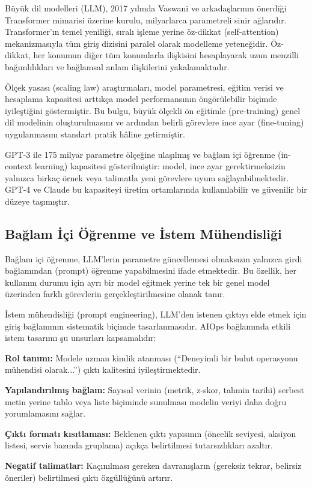 Büyük dil modelleri (LLM), 2017 yılında Vaswani ve arkadaşlarının önerdiği Transformer mimarisi üzerine kurulu, milyarlarca parametreli sinir ağlarıdır.
Transformer'ın temel yeniliği, sıralı işleme yerine öz-dikkat (self-attention) mekanizmasıyla tüm giriş dizisini paralel olarak modelleme yeteneğidir.
Öz-dikkat, her konumun diğer tüm konumlarla ilişkisini hesaplayarak uzun menzilli bağımlılıkları ve bağlamsal anlam ilişkilerini yakalamaktadır.

Ölçek yasası (scaling law) araştırmaları, model parametresi, eğitim verisi ve hesaplama kapasitesi arttıkça model performansının öngörülebilir biçimde iyileştiğini göstermiştir.
Bu bulgu, büyük ölçekli ön eğitimle (pre-training) genel dil modelinin oluşturulmasını ve ardından belirli görevlere ince ayar (fine-tuning) uygulanmasını standart pratik hâline getirmiştir.

GPT-3 \autocite{brown2020} ile 175 milyar parametre ölçeğine ulaşılmış ve bağlam içi öğrenme (in-context learning) kapasitesi gösterilmiştir: model, ince ayar gerektirmeksizin yalnızca birkaç örnek veya talimatla yeni görevlere uyum sağlayabilmektedir.
GPT-4 \autocite{openai2023} ve Claude \autocite{anthropic2024} bu kapasiteyi üretim ortamlarında kullanılabilir ve güvenilir bir düzeye taşımıştır.

\subsection{Bağlam İçi Öğrenme ve İstem Mühendisliği}

Bağlam içi öğrenme, LLM'lerin parametre güncellemesi olmaksızın yalnızca girdi bağlamından (prompt) öğrenme yapabilmesini ifade etmektedir.
Bu özellik, her kullanım durumu için ayrı bir model eğitmek yerine tek bir genel model üzerinden farklı görevlerin gerçekleştirilmesine olanak tanır.

İstem mühendisliği (prompt engineering), LLM'den istenen çıktıyı elde etmek için giriş bağlamının sistematik biçimde tasarlanmasıdır.
AIOps bağlamında etkili istem tasarımı şu unsurları kapsamalıdır:

\begin{maddelendir}[label=--]
    \item \textbf{Rol tanımı:} Modele uzman kimlik atanması (``Deneyimli bir bulut operasyonu mühendisi olarak...'') çıktı kalitesini iyileştirmektedir.
    \item \textbf{Yapılandırılmış bağlam:} Sayısal verinin (metrik, z-skor, tahmin tarihi) serbest metin yerine tablo veya liste biçiminde sunulması modelin veriyi daha doğru yorumlamasını sağlar.
    \item \textbf{Çıktı formatı kısıtlaması:} Beklenen çıktı yapısının (öncelik seviyesi, aksiyon listesi, servis bazında gruplama) açıkça belirtilmesi tutarsızlıkları azaltır.
    \item \textbf{Negatif talimatlar:} Kaçınılması gereken davranışların (gereksiz tekrar, belirsiz öneriler) belirtilmesi çıktı özgüllüğünü artırır.
\end{maddelendir}

